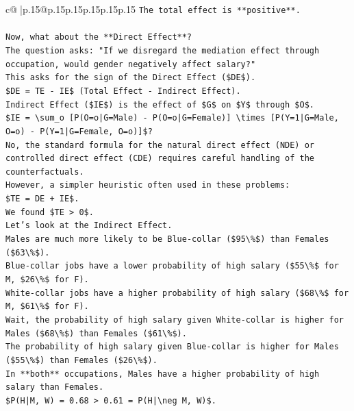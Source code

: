 \documentclass{article}
\begin{document}
{\begin{supertabular}{c@{$\;$}|p{.15\linewidth}@{}p{.15\linewidth}p{.15\linewidth}p{.15\linewidth}p{.15\linewidth}p{.15\linewidth}}
{{{\texttt{The total effect is **positive**.} \\
\\ 
\texttt{Now, what about the **Direct Effect**?} \\
\texttt{The question asks: "If we disregard the mediation effect through occupation, would gender negatively affect salary?"} \\
\texttt{This asks for the sign of the Direct Effect (\$DE\$).} \\
\texttt{\$DE = TE {-} IE\$ (Total Effect {-} Indirect Effect).} \\
\texttt{Indirect Effect (\$IE\$) is the effect of \$G\$ on \$Y\$ through \$O\$.} \\
\texttt{\$IE = \textbackslash{}sum\_o {[}P(O=o|G=Male) {-} P(O=o|G=Female){]} \textbackslash{}times {[}P(Y=1|G=Male, O=o) {-} P(Y=1|G=Female, O=o){]}\$?} \\
\texttt{No, the standard formula for the natural direct effect (NDE) or controlled direct effect (CDE) requires careful handling of the counterfactuals.} \\
\texttt{However, a simpler heuristic often used in these problems:} \\
\texttt{\$TE = DE + IE\$.} \\
\texttt{We found \$TE > 0\$.} \\
\texttt{Let's look at the Indirect Effect.} \\
\texttt{Males are much more likely to be Blue{-}collar (\$95\textbackslash{}\%\$) than Females (\$63\textbackslash{}\%\$).} \\
\texttt{Blue{-}collar jobs have a lower probability of high salary (\$55\textbackslash{}\%\$ for M, \$26\textbackslash{}\%\$ for F).} \\
\texttt{White{-}collar jobs have a higher probability of high salary (\$68\textbackslash{}\%\$ for M, \$61\textbackslash{}\%\$ for F).} \\
\texttt{Wait, the probability of high salary given White{-}collar is higher for Males (\$68\textbackslash{}\%\$) than Females (\$61\textbackslash{}\%\$).} \\
\texttt{The probability of high salary given Blue{-}collar is higher for Males (\$55\textbackslash{}\%\$) than Females (\$26\textbackslash{}\%\$).} \\
\texttt{In **both** occupations, Males have a higher probability of high salary than Females.} \\
\texttt{\$P(H|M, W) = 0.68 > 0.61 = P(H|\textbackslash{}neg M, W)\$.} \\
}}}
\end{supertabular}}
\end{document}
